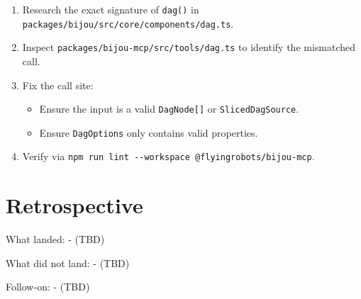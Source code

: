 \begin{enumerate}
\def\labelenumi{\arabic{enumi}.}
\tightlist
\item
  Research the exact signature of \texttt{d\allowbreak{}a\allowbreak{}g\allowbreak{}(\allowbreak{})} in \texttt{p\allowbreak{}a\allowbreak{}c\allowbreak{}k\allowbreak{}a\allowbreak{}g\allowbreak{}e\allowbreak{}s\allowbreak{}/\allowbreak{}b\allowbreak{}i\allowbreak{}j\allowbreak{}o\allowbreak{}u\allowbreak{}/\allowbreak{}s\allowbreak{}r\allowbreak{}c\allowbreak{}/\allowbreak{}c\allowbreak{}o\allowbreak{}r\allowbreak{}e\allowbreak{}/\allowbreak{}c\allowbreak{}o\allowbreak{}m\allowbreak{}p\allowbreak{}o\allowbreak{}n\allowbreak{}e\allowbreak{}n\allowbreak{}t\allowbreak{}s\allowbreak{}/\allowbreak{}d\allowbreak{}a\allowbreak{}g\allowbreak{}.\allowbreak{}t\allowbreak{}s}.
\item
  Inspect \texttt{p\allowbreak{}a\allowbreak{}c\allowbreak{}k\allowbreak{}a\allowbreak{}g\allowbreak{}e\allowbreak{}s\allowbreak{}/\allowbreak{}b\allowbreak{}i\allowbreak{}j\allowbreak{}o\allowbreak{}u\allowbreak{}-\allowbreak{}m\allowbreak{}c\allowbreak{}p\allowbreak{}/\allowbreak{}s\allowbreak{}r\allowbreak{}c\allowbreak{}/\allowbreak{}t\allowbreak{}o\allowbreak{}o\allowbreak{}l\allowbreak{}s\allowbreak{}/\allowbreak{}d\allowbreak{}a\allowbreak{}g\allowbreak{}.\allowbreak{}t\allowbreak{}s} to identify the mismatched call.
\item
  Fix the call site:

  \begin{itemize}
  \tightlist
  \item
    Ensure the input is a valid \texttt{D\allowbreak{}a\allowbreak{}g\allowbreak{}N\allowbreak{}o\allowbreak{}d\allowbreak{}e\allowbreak{}[\allowbreak{}]} or \texttt{S\allowbreak{}l\allowbreak{}i\allowbreak{}c\allowbreak{}e\allowbreak{}d\allowbreak{}D\allowbreak{}a\allowbreak{}g\allowbreak{}S\allowbreak{}o\allowbreak{}u\allowbreak{}r\allowbreak{}c\allowbreak{}e}.
  \item
    Ensure \texttt{D\allowbreak{}a\allowbreak{}g\allowbreak{}O\allowbreak{}p\allowbreak{}t\allowbreak{}i\allowbreak{}o\allowbreak{}n\allowbreak{}s} only contains valid properties.
  \end{itemize}
\item
  Verify via \texttt{n\allowbreak{}p\allowbreak{}m\allowbreak{} \allowbreak{}r\allowbreak{}u\allowbreak{}n\allowbreak{} \allowbreak{}l\allowbreak{}i\allowbreak{}n\allowbreak{}t\allowbreak{} \allowbreak{}-\allowbreak{}-\allowbreak{}w\allowbreak{}o\allowbreak{}r\allowbreak{}k\allowbreak{}s\allowbreak{}p\allowbreak{}a\allowbreak{}c\allowbreak{}e\allowbreak{} \allowbreak{}@\allowbreak{}f\allowbreak{}l\allowbreak{}y\allowbreak{}i\allowbreak{}n\allowbreak{}g\allowbreak{}r\allowbreak{}o\allowbreak{}b\allowbreak{}o\allowbreak{}t\allowbreak{}s\allowbreak{}/\allowbreak{}b\allowbreak{}i\allowbreak{}j\allowbreak{}o\allowbreak{}u\allowbreak{}-\allowbreak{}m\allowbreak{}c\allowbreak{}p}.
\end{enumerate}

\section{Retrospective}\label{record-251-retrospective}

What landed: - (TBD)

What did not land: - (TBD)

Follow-on: - (TBD)

